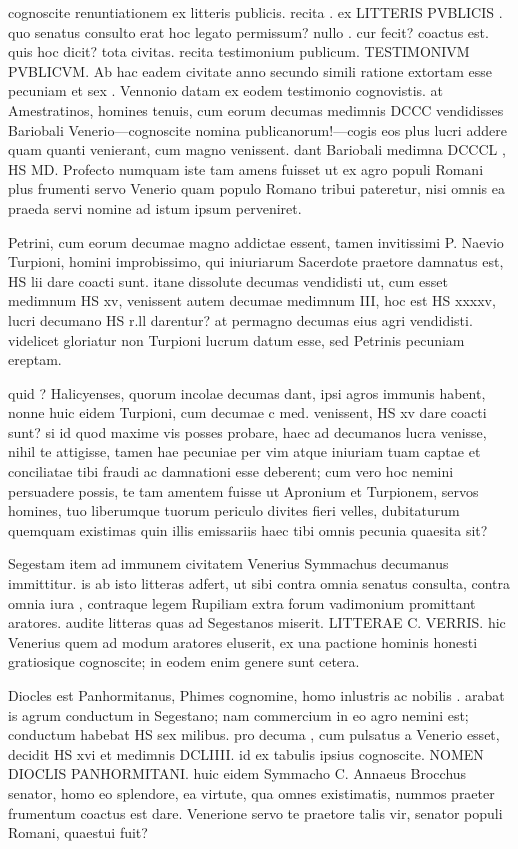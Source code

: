  cognoscite renuntiationem ex litteris publicis. recita . ex LITTERIS PVBLICIS . quo senatus consulto erat hoc legato permissum? nullo . cur fecit? coactus est. quis hoc dicit? tota civitas. recita testimonium publicum. TESTIMONIVM PVBLICVM. Ab hac eadem civitate anno secundo simili ratione extortam esse pecuniam et sex . Vennonio datam ex eodem testimonio cognovistis. at Amestratinos, homines tenuis, cum eorum decumas medimnis DCCC vendidisses Bariobali Venerio—cognoscite nomina publicanorum!—cogis eos plus lucri addere quam quanti venierant, cum magno venissent. dant Bariobali medimna DCCCL , HS MD. Profecto numquam iste tam amens fuisset ut ex agro populi Romani plus frumenti servo Venerio quam populo Romano tribui pateretur, nisi omnis ea praeda servi nomine ad istum ipsum perveniret.

 Petrini, cum eorum decumae magno addictae essent, tamen invitissimi P. Naevio Turpioni, homini improbissimo, qui iniuriarum Sacerdote praetore damnatus est, HS lii dare coacti sunt. itane dissolute decumas vendidisti ut, cum esset medimnum HS xv, venissent autem decumae medimnum III, hoc est HS xxxxv, lucri decumano HS r.ll darentur? at permagno decumas eius agri vendidisti. videlicet gloriatur non Turpioni lucrum datum esse, sed Petrinis pecuniam ereptam.

 quid ? Halicyenses, quorum incolae decumas dant, ipsi agros immunis habent, nonne huic eidem Turpioni, cum decumae c med. venissent, HS xv dare coacti sunt? si id quod maxime vis posses probare, haec ad decumanos lucra venisse, nihil te attigisse, tamen hae pecuniae per vim atque iniuriam tuam captae et conciliatae tibi fraudi ac damnationi esse deberent; cum vero hoc nemini persuadere possis, te tam amentem fuisse ut Apronium et Turpionem, servos homines, tuo liberumque tuorum periculo divites fieri velles, dubitaturum quemquam existimas quin illis emissariis haec tibi omnis pecunia quaesita sit?

 Segestam item ad immunem civitatem Venerius Symmachus decumanus immittitur. is ab isto litteras adfert, ut sibi contra omnia senatus consulta, contra omnia iura , contraque legem Rupiliam extra forum vadimonium promittant aratores. audite litteras quas ad Segestanos miserit. LITTERAE C. VERRIS. hic Venerius quem ad modum aratores eluserit, ex una pactione hominis honesti gratiosique cognoscite; in eodem enim genere sunt cetera.

 Diocles est Panhormitanus, Phimes cognomine, homo inlustris ac nobilis . arabat is agrum conductum in Segestano; nam commercium in eo agro nemini est; conductum habebat HS sex milibus. pro decuma , cum pulsatus a Venerio esset, decidit HS xvi et medimnis DCLIIII. id ex tabulis ipsius cognoscite. NOMEN DIOCLIS PANHORMITANI. huic eidem Symmacho C. Annaeus Brocchus senator, homo eo splendore, ea virtute, qua omnes existimatis, nummos praeter frumentum coactus est dare. Venerione servo te praetore talis vir, senator populi Romani, quaestui fuit?

